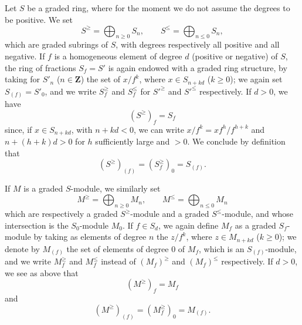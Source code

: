 \begin{env}[8.2.1]
\label{II.8.2.1}
Let $S$ be a graded ring, where for the moment we do not assume the degrees
to be positive. We set
\begin{equation}
\label{II.8.2.1.1}
  S^{\geq}=\bigoplus_{n\geq0}S_n,
  \qquad
  S^{\leq}=\bigoplus_{n\leq0}S_n,
\tag{8.2.1.1}
\end{equation}
which are graded subrings of $S$, with degrees respectively all
positive and all negative. If $f$ is a homogeneous element of degree $d$
(positive or negative) of $S$, the ring of fractions $S_f=S'$ is again endowed
with a graded ring structure, by taking for $S'_n$ ($n\in\mathbf{Z}$)
the set of $x/f^k$, where $x\in S_{n+kd}$ ($k\geq0$); we again set
$S_{(f)}=S'_0$, and we write $S_f^{\geq}$ and $S_f^{\leq}$ for $S'^{\geq}$ and
$S'^{\leq}$ respectively. If $d>0$, we have
\begin{equation}
\label{II.8.2.1.2}
  (S^{\geq})_f=S_f
\tag{8.2.1.2}
\end{equation}
since, if $x\in S_{n+kd}$, with $n+kd<0$, we can write
$x/f^k=xf^h/f^{h+k}$ and $n+(h+k)d>0$ for $h$ sufficiently large and $>0$. We
conclude by definition that
\begin{equation}
\label{II.8.2.1.3}
  (S^{\geq})_{(f)}=(S_f^{\geq})_0=S_{(f)}.
\tag{8.2.1.3}
\end{equation}

If $M$ is a graded $S$-module, we similarly set
\begin{equation}
\label{II.8.2.1.4}
  M^{\geq}=\bigoplus_{n\geq0}M_n,
  \qquad
  M^{\leq}=\bigoplus_{n\leq0}M_n
\tag{8.2.1.4}
\end{equation}
which are respectively a graded $S^{\geq}$-module and a graded
$S^{\leq}$-module, and whose intersection is the $S_0$-module $M_0$. If $f\in S_d$, we
again define $M_f$ as a graded $S_f$-module by taking as elements of
degree $n$ the $z/f^k$, where $z\in M_{n+kd}$ ($k\geq0$); we denote by
$M_{(f)}$ the set of elements of degree $0$ of $M_f$, which is an
$S_{(f)}$-module, and we write $M_f^{\geq}$ and $M_f^{\leq}$ instead of
$(M_f)^{\geq}$ and $(M_f)^{\leq}$ respectively. If $d>0$, we see as
above that
\begin{equation}
\label{II.8.2.1.5}
  (M^{\geq})_f=M_f
\tag{8.2.1.5}
\end{equation}
and
\begin{equation}
\label{II.8.2.1.6}
  (M^{\geq})_{(f)}=(M_f^{\geq})_0=M_{(f)}.
\tag{8.2.1.6}
\end{equation}
\end{env}


